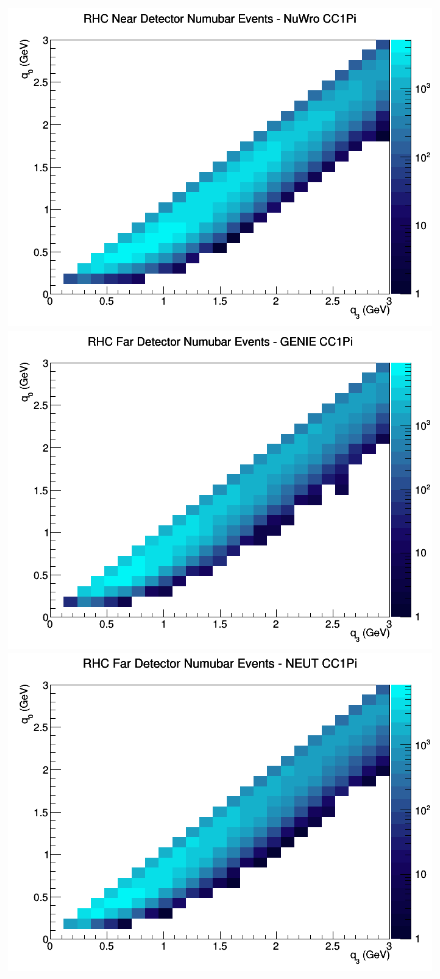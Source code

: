 \documentclass[12pt]{article}
\begin{document}
\begin{figure}[h]
\includegraphics[width=\linewidth]{q0_q3/nominal/CC1Pi_RHC_ND_numubar_q3_q0_NuWro.png}
\endminipage
\newline
{}
\includegraphics[width=\linewidth]{q0_q3/nominal/CC1Pi_RHC_FD_numubar_q3_q0_GENIE.png}
\endminipage
{}
\includegraphics[width=\linewidth]{q0_q3/nominal/CC1Pi_RHC_FD_numubar_q3_q0_NEUT.png}

\end{figure}
\end{document}
